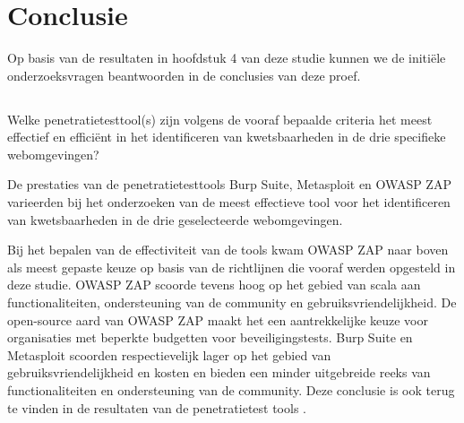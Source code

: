 
\chapter{Conclusie}%
\label{ch:conclusie}


Op basis van de resultaten in hoofdstuk 4 van deze studie kunnen we de initiële onderzoeksvragen beantwoorden in de 
conclusies van deze proef.

\section{}
  Welke penetratietesttool(s) zijn volgens de vooraf bepaalde criteria het meest effectief en efficiënt in het 
  identificeren van kwetsbaarheden in de drie specifieke webomgevingen?

  De prestaties van de penetratietesttools Burp Suite, Metasploit en OWASP ZAP varieerden bij het onderzoeken van de 
  meest effectieve tool voor het identificeren van kwetsbaarheden in de drie geselecteerde webomgevingen.

  Bij het bepalen van de effectiviteit van de tools kwam OWASP ZAP naar boven als meest gepaste keuze op basis van de richtlijnen 
  die vooraf werden opgesteld in deze studie. OWASP ZAP scoorde tevens hoog op het gebied van scala aan functionaliteiten, 
  ondersteuning van de community en gebruiksvriendelijkheid. De open-source aard van OWASP ZAP maakt het een aantrekkelijke 
  keuze voor organisaties met beperkte budgetten voor beveiligingstests. Burp Suite en Metasploit scoorden respectievelijk 
  lager op het gebied van gebruiksvriendelijkheid en kosten en bieden een minder uitgebreide reeks van functionaliteiten en 
  ondersteuning van de community. Deze conclusie is ook terug te vinden in de resultaten van de penetratietest tools 
  .

